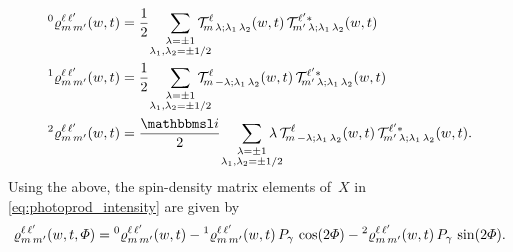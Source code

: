 \begin{align}
  \label{eq:photoprod_rho_0}
  \prescript{0}{}{\varrho}^{\ell\, \ell'}_{m\, m'}(w, t)
  ={}& \frac{1}{2}\quad \sum_{\substack{\lambda = \pm 1 \\ \mathclap{\lambda_1, \lambda_2 = \pm 1/2}}}
  \mathcal{T}^\ell_{\!m\, \lambda; \lambda_1\, \lambda_2}(w, t)\,
  \mathcal{T}^{\ell' *}_{\!m'\, \lambda; \lambda_1\, \lambda_2}(w, t)
  \\
  \label{eq:photoprod_rho_1}
  \prescript{1}{}{\varrho}^{\ell\, \ell'}_{m\, m'}(w, t)
  ={}& \frac{1}{2}\quad \sum_{\substack{\lambda = \pm 1 \\ \mathclap{\lambda_1, \lambda_2 = \pm 1/2}}}
  \mathcal{T}^\ell_{\!m\, {-\lambda}; \lambda_1\, \lambda_2}(w, t)\,
  \mathcal{T}^{\ell' *}_{\!m'\, \lambda; \lambda_1\, \lambda_2}(w, t)
  \\
  \label{eq:photoprod_rho_2}
  \prescript{2}{}{\varrho}^{\ell\, \ell'}_{m\, m'}(w, t)
  ={}& \frac{\imag}{2}\quad \sum_{\substack{\lambda = \pm 1 \\ \mathclap{\lambda_1, \lambda_2 = \pm 1/2}}}
  \lambda\,
  \mathcal{T}^\ell_{\!m\, {-\lambda}; \lambda_1\, \lambda_2}(w, t)\,
  \mathcal{T}^{\ell' *}_{\!m'\, \lambda; \lambda_1\, \lambda_2}(w, t).
\end{align}
Using the above, the spin-density matrix elements of~$X$ in
\cref{eq:photoprod_intensity} are given by
\begin{equation}
  \label{eq:photoprod_spin_dens_sum}
  \varrho^{\ell\, \ell'}_{m\, m'}(w, t, \Phi)
  = \prescript{0}{}{\varrho}^{\ell\, \ell'}_{m\, m'}(w, t)
  - \prescript{1}{}{\varrho}^{\ell\, \ell'}_{m\, m'}(w, t)\, P_\gamma\, \cos(2 \Phi)
  - \prescript{2}{}{\varrho}^{\ell\, \ell'}_{m\, m'}(w, t)\, P_\gamma\, \sin(2 \Phi).
\end{equation}

